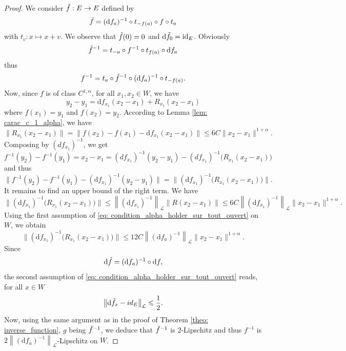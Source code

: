 \documentclass[11pt,reqno,a4paper]{article}%
\theoremstyle{definition}
\theoremstyle{remark}
\renewcommand{\leq}{\leqslant}
\newcommand{\opnorm}[1]{{\left\| #1 \right\|}_{\mathcal{L}}}
\renewcommand{\d}{\mathrm{d}}
\renewcommand{\d}{\mathrm{d}}
\begin{document}
\begin{proof}
    We consider $\Tilde{f}: E \to E$ defined by 
    $$\Tilde{f} = (\d f_a)^{-1} \circ t_{-f(a)} \circ f \circ t_{a}$$
    with $t_v : x \mapsto x + v $.
    We observe that $ \Tilde{f}(0) = 0$ and $\d \Tilde{f}_0 = \mathrm{id}_E$.
    Obviously
    $$\Tilde{f}^{-1} = t_{-a} \circ f^{-1} \circ t_{f(a)} \circ \d f_a$$
    thus
    $$f^{-1} = t_a \circ \Tilde{f}^{-1} \circ (\d f_a)^{-1}  \circ  t_{-f(a)}.$$
    Now, since $f$ is of class $C^{1,\alpha}$, for all $x_1,x_2 \in W$, we have
     $$ y_2 - y_1 = \d f_{x_1}(x_2-x_1) + R_{x_1}(x_2- x_1)$$
    where $f(x_1) = y_1$ and $f(x_2) = y_2$. 
    According to Lemma \ref{lem: carac_c_1_alpha}, we have
    $$\| R_{x_1}(x_2 - x_1) \| = \| f(x_2) - f(x_1) - \d f_{x_1}(x_2-x_1)\| \leq 6 C \|x_2 -x_1\|^{1 + \alpha}.$$
    Composing by $(df_{x_1})^{-1}$, we get
    $$f^{-1}(y_2) - f^{-1}(y_1) = x_2-x_1 = (df_{x_1})^{-1}(y_2 - y_1) - (df_{x_1})^{-1}\big(R_{x_1}(x_2-x_1)\big)$$
    and thus
    \[ \| f^{-1}(y_2) - f^{-1}(y_1) - (\d f_{x_1})^{-1}(y_2 - y_1) \| = \| (\d f_{x_1})^{-1}\big(R_{x_1}(x_2-x_1)\big) \|.\]
    It remains to find an upper bound of the right term.
    We have
    \[ \| (\d f_{x_1})^{-1}\big(R_{x_1}(x_2-x_1)\big) \| \leq \opnorm{(\d f_{x_1})^{-1} } \| R(x_2-x_1) \| \leq  6 C \opnorm{(\d f_{x_1})^{-1}} \|x_2-x_1\|^{1+\alpha} .\]
    Using the first assumption of \eqref{eq: condition_alpha_holder_sur_tout_ouvert} on $W$, we obtain 
    \begin{equation} \label{eq: etape_controle_reste}
         \| (\d f_{x_1})^{-1}\big(R_{x_1}(x_2-x_1)\big) \| \leq   12 C \opnorm{(\d f_{a})^{-1}} \|x_2-x_1\|^{1+\alpha} .
    \end{equation}
    Since 
    $$\d \Tilde{f} =  (\d f_a)^{-1} \circ \d f,$$
    the second assumption of \eqref{eq: condition_alpha_holder_sur_tout_ouvert} reads, for all $x \in W$
    \[ \opnorm{ \d \Tilde{f}_x - id_E } \leq \frac{1}{2}. \]
    Now, using the same argument as in the proof of Theorem \ref{theo: inverse_function}, $g$ being $\Tilde{f}^{-1}$, we deduce that $\Tilde{f}^{-1} $ is $2$-Lipschitz and thus $f^{-1}$ is $2 \opnorm{ (\d f_a)^{-1} } $-Lipschitz on $W$. 

\end{proof}
\end{document}
